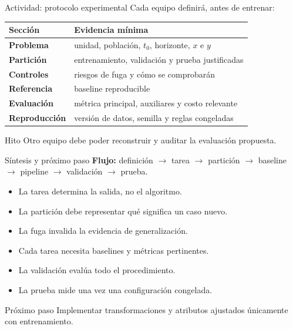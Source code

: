 \documentclass[aspectratio=169,10pt]{beamer}
\begin{document}
\begin{frame}{Actividad: protocolo experimental}
  \scriptsize
  Cada equipo definirá, antes de entrenar:
  \begin{tabularx}{\textwidth}{>{\bfseries}p{} X}
    \toprule Sección & Evidencia mínima \\ \midrule
    Problema & unidad, población, $t_0$, horizonte, $x$ e $y$ \\
    Partición & entrenamiento, validación y prueba justificadas \\
    Controles & riesgos de fuga y cómo se comprobarán \\
    Referencia & baseline reproducible \\
    Evaluación & métrica principal, auxiliares y costo relevante \\
    Reproducción & versión de datos, semilla y reglas congeladas \\
    \bottomrule
  \end{tabularx}
  \begin{block}{Hito}
    Otro equipo debe poder reconstruir y auditar la evaluación propuesta.
  \end{block}
\end{frame}

\begin{frame}{Síntesis y próximo paso}
  \footnotesize
  \textbf{Flujo:} definición $\rightarrow$ tarea $\rightarrow$ partición $\rightarrow$ baseline $\rightarrow$ pipeline $\rightarrow$ validación $\rightarrow$ prueba.
  \begin{itemize}
    \item La tarea determina la salida, no el algoritmo.
    \item La partición debe representar qué significa un caso nuevo.
    \item La fuga invalida la evidencia de generalización.
    \item Cada tarea necesita baselines y métricas pertinentes.
    \item La validación evalúa todo el procedimiento.
    \item La prueba mide una vez una configuración congelada.
  \end{itemize}
  \begin{block}{Próximo paso}
    Implementar transformaciones y atributos ajustados únicamente con entrenamiento.
  \end{block}
\end{frame}
\end{document}
